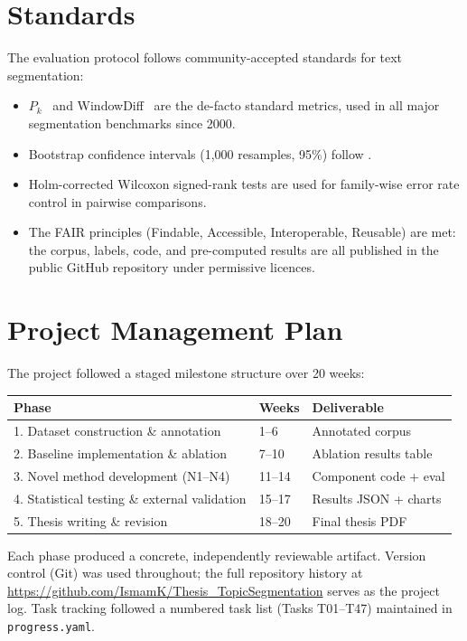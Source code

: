 \section{Standards}

The evaluation protocol follows community-accepted standards for text
segmentation:
\begin{itemize}
  \item $P_k$~\cite{beeferman1999statistical} and WindowDiff~\cite{pevzner2002critique}
        are the de-facto standard metrics, used in all major segmentation benchmarks
        since 2000.
  \item Bootstrap confidence intervals (1{,}000 resamples, 95\%) follow
        \cite{efron1993_bootstrap}.
  \item Holm-corrected Wilcoxon signed-rank tests are used for family-wise
        error rate control in pairwise comparisons.
  \item The FAIR principles (Findable, Accessible, Interoperable, Reusable) are
        met: the corpus, labels, code, and pre-computed results are all published
        in the public GitHub repository under permissive licences.
\end{itemize}

\section{Project Management Plan}

The project followed a staged milestone structure over 20 weeks:

\begin{center}
\begin{tabular}{lll}
  \toprule
  Phase & Weeks & Deliverable \\
  \midrule
  1. Dataset construction \& annotation & 1--6  & Annotated \dataset{} corpus \\
  2. Baseline implementation \& ablation & 7--10 & Ablation results table \\
  3. Novel method development (N1--N4)   & 11--14 & Component code + eval \\
  4. Statistical testing \& external validation & 15--17 & Results JSON + charts \\
  5. Thesis writing \& revision          & 18--20 & Final thesis PDF \\
  \bottomrule
\end{tabular}
\end{center}

Each phase produced a concrete, independently reviewable artifact.
Version control (Git) was used throughout; the full repository history at
\url{https://github.com/IsmamK/Thesis_TopicSegmentation} serves as the
project log.
Task tracking followed a numbered task list (Tasks T01--T47) maintained in
\texttt{progress.yaml}.

